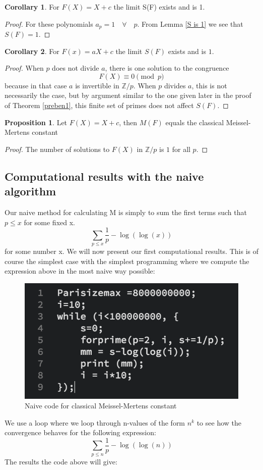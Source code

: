 \documentclass{article}
\theoremstyle{definition}
\newtheorem{proposition}[theorem]{Proposition}
\newtheorem*{corollary}{Corollary}
\theoremstyle{remark}
\begin{document}
\begin{corollary}
For $F(X) = X+c$ the limit S(F) exists and is 1.
\end{corollary}
\begin{proof}
For these polynomials $a_p=1 \quad \forall \quad p$. From Lemma \ref{S is 1} we see that $S(F)=1$.
\end{proof}
\begin{corollary}
For $F(x)=aX+c$ the limit $S(F)$ exists and is $1$.
\end{corollary}
\begin{proof}
When $p$ does not divide $a$, there is one solution to the congruence
$$F(X) \equiv 0 \pmod{p}$$
because in that case $a$ is invertible in $\mathbb{Z}/p$.
When $p$ divides $a$, this is not necessarily the case, but by argument similar to the one given later in the proof of Theorem \ref{preben1}, this finite set of primes does not affect $S(F)$.
\end{proof}

\begin{proposition}
Let $F(X) = X + c$, then $M(F)$ equals the classical Meissel-Mertens constant
\end{proposition}
\begin{proof}
The number of solutions to $F(X)$ in $\mathbb{Z}/p$ is $1$ for all $p$.
\end{proof}

\subsection{Computational results with the naive algorithm}

Our naive method for calculating M is simply to sum the first terms such that $p\leq x$ for some fixed x.
$$\sum_{p\leq x}\frac{1}{p}-\log\left(\log(x)\right)$$
for some number x.
We will now present our first computational results. This is of course the simplest case with the simplest programming where we compute the expression above in the most naive way possible:
\begin{figure}[H]
\centering\includegraphics[width = 0.7 \textwidth]{classicalMCode.png}
\caption{\label{fig: ClassicalM} Naive code for classical Meissel-Mertens constant}
\end{figure}
We use a loop where we loop through n-values of the form $n^k$ to see how the convergence behaves for the following expression:
$$\sum_{p\leq n}\frac{1}{p}-\log\left(\log(n)\right)$$
The results the code above will give:
\end{document}
